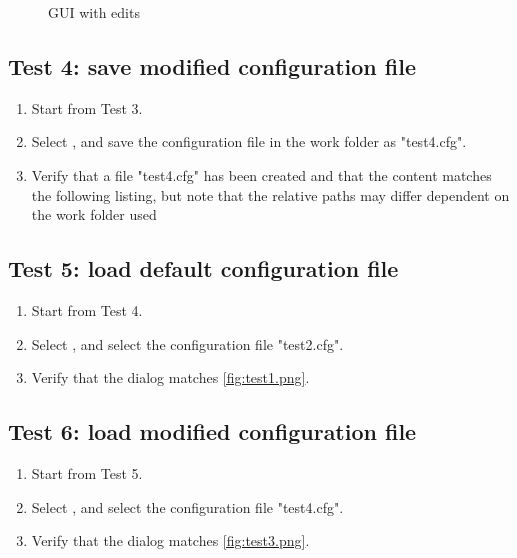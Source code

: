 \begin{enumerate}
\begin{figure}[H]
\caption{GUI with edits}
\label{fig:test3.png}
\end{figure}
\end{enumerate}

\subsection{Test 4: save modified configuration file}
\begin{enumerate}
\item Start from Test 3.
\item Select  \textrightarrow {}, and save the configuration file in the work folder as "test4.cfg".
\item Verify that a file "test4.cfg" has been created and that the content matches the following listing, but note that the relative paths may differ dependent on the work folder used

\end{enumerate}

\subsection{Test 5: load default configuration file}
\begin{enumerate}
\item Start from Test 4.
\item Select  \textrightarrow {}, and select the configuration file "test2.cfg".
\item Verify that the dialog matches \autoref{fig:test1.png}.
\end{enumerate}

\subsection{Test 6: load modified configuration file}
\begin{enumerate}
\item Start from Test 5.
\item Select  \textrightarrow {}, and select the configuration file "test4.cfg".
\item Verify that the dialog matches \autoref{fig:test3.png}.
\end{enumerate}

